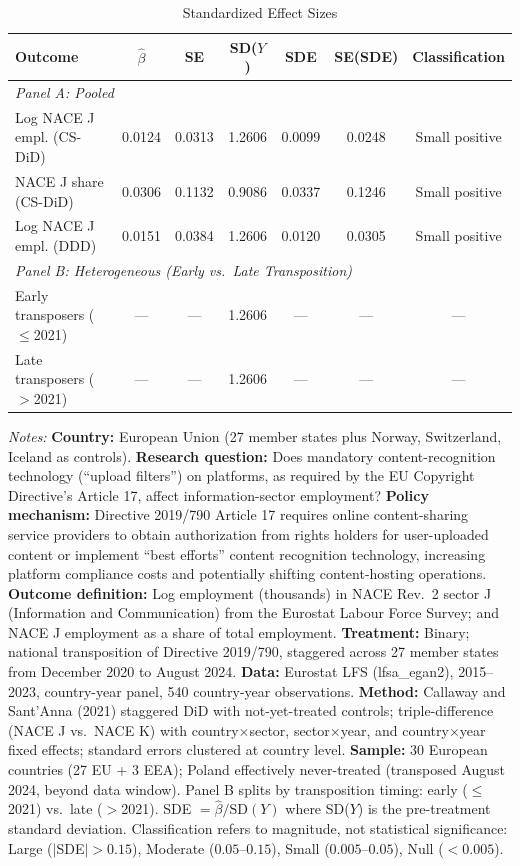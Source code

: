 \begin{table}[htbp]
\centering
\caption{Standardized Effect Sizes}
\label{tab:sde}
\begin{threeparttable}
\footnotesize
\begin{tabular}{lcccccc}
\hline\hline
Outcome & $\hat{\beta}$ & SE & SD($Y$) & SDE & SE(SDE) & Classification \\
\hline
\multicolumn{7}{l}{\textit{Panel A: Pooled}} \\
Log NACE J empl. (CS-DiD) & 0.0124 & 0.0313 & 1.2606 & 0.0099 & 0.0248 & Small positive \\
NACE J share (CS-DiD) & 0.0306 & 0.1132 & 0.9086 & 0.0337 & 0.1246 & Small positive \\
Log NACE J empl. (DDD) & 0.0151 & 0.0384 & 1.2606 & 0.0120 & 0.0305 & Small positive \\
[4pt]
\multicolumn{7}{l}{\textit{Panel B: Heterogeneous (Early vs.\ Late Transposition)}} \\
Early transposers ($\leq$2021) & --- & --- & 1.2606 & --- & --- & --- \\
Late transposers ($>$2021) & --- & --- & 1.2606 & --- & --- & --- \\
\hline\hline
\end{tabular}
\begin{tablenotes}[flushleft]\footnotesize
\item \textit{Notes:} \textbf{Country:} European Union (27 member states plus Norway, Switzerland, Iceland as controls). \textbf{Research question:} Does mandatory content-recognition technology (``upload filters'') on platforms, as required by the EU Copyright Directive's Article 17, affect information-sector employment? \textbf{Policy mechanism:} Directive 2019/790 Article 17 requires online content-sharing service providers to obtain authorization from rights holders for user-uploaded content or implement ``best efforts'' content recognition technology, increasing platform compliance costs and potentially shifting content-hosting operations. \textbf{Outcome definition:} Log employment (thousands) in NACE Rev.~2 sector J (Information and Communication) from the Eurostat Labour Force Survey; and NACE J employment as a share of total employment. \textbf{Treatment:} Binary; national transposition of Directive 2019/790, staggered across 27 member states from December 2020 to August 2024. \textbf{Data:} Eurostat LFS (lfsa\_egan2), 2015--2023, country-year panel, 540 country-year observations. \textbf{Method:} Callaway and Sant'Anna (2021) staggered DiD with not-yet-treated controls; triple-difference (NACE J vs.\ NACE K) with country$\times$sector, sector$\times$year, and country$\times$year fixed effects; standard errors clustered at country level. \textbf{Sample:} 30 European countries (27 EU + 3 EEA); Poland effectively never-treated (transposed August 2024, beyond data window). Panel B splits by transposition timing: early ($\leq$2021) vs.\ late ($>$2021). SDE $= \hat{\beta} / \text{SD}(Y)$ where SD($Y$) is the pre-treatment standard deviation. Classification refers to magnitude, not statistical significance: Large ($|$SDE$| > 0.15$), Moderate ($0.05$--$0.15$), Small ($0.005$--$0.05$), Null ($< 0.005$).

\end{tablenotes}
\end{threeparttable}
\end{table}
